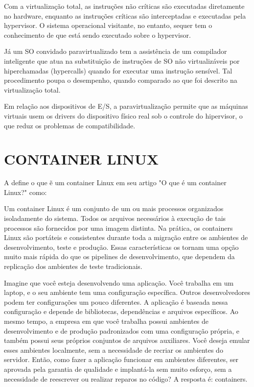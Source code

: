 Com a virtualização total, as instruções não críticas são executadas diretamente no hardware, enquanto as instruções críticas são interceptadas e executadas pela hypervisor. O sistema operacional visitante, no entanto, sequer tem o conhecimento de que está sendo executado sobre o hypervisor.

Já um SO convidado paravirtualizado tem a assistência de um compilador inteligente que atua na substituição de instruções de SO não virtualizáveis por hiperchamadas (hypercalls) quando for executar uma instrução sensível. Tal procedimento poupa o desempenho, quando comparado ao que foi descrito na virtualização total.

Em relação aos dispositivos de E/S, a paravirtualização permite que as máquinas virtuais usem os drivers do dispositivo físico real sob o controle do hipervisor, o que reduz os problemas de compatibilidade.

\section{CONTAINER LINUX}
\label{sec:linux-countainer}

A  define o que ẽ um container Linux em seu artigo "O que é um container Linux?" como:
\begin{citacao}
	Um container Linux é um conjunto de um ou mais processos organizados isoladamente do sistema. Todos os arquivos necessários à execução de tais processos são fornecidos por uma imagem distinta. Na prática, os containers Linux são portáteis e consistentes durante toda a migração entre os ambientes de desenvolvimento, teste e produção. Essas características os tornam uma opção muito mais rápida do que os pipelines de desenvolvimento, que dependem da replicação dos ambientes de teste tradicionais.
\end{citacao}  

Imagine que você esteja desenvolvendo uma aplicação. Você trabalha em um laptop, e o seu ambiente tem uma configuração específica. Outros desenvolvedores podem ter configurações um pouco diferentes. A aplicação é baseada nessa configuração e depende de bibliotecas, dependências e arquivos específicos. Ao mesmo tempo, a empresa em que você trabalha possui ambientes de desenvolvimento e de produção padronizados com uma configuração própria, e também possui seus próprios conjuntos de arquivos auxiliares. Você deseja emular esses ambientes localmente, sem a necessidade de recriar os ambientes do servidor. Então, como fazer a aplicação funcionar em ambientes diferentes, ser aprovada pela garantia de qualidade e implantá-la sem muito esforço, sem a necessidade de reescrever ou realizar reparos no código? A resposta é: containers.

